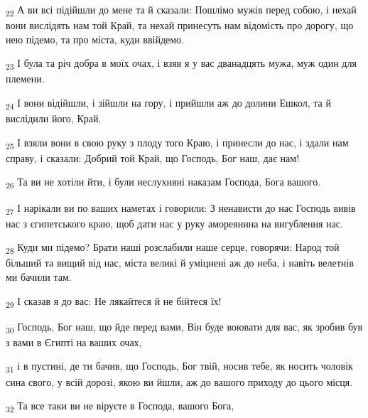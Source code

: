 \begin{tcolorbox}
\textsubscript{22} А ви всі підійшли до мене та й сказали: Пошлімо мужів перед собою, і нехай вони вислідять нам той Край, та нехай принесуть нам відомість про дорогу, що нею підемо, та про міста, куди ввійдемо.
\end{tcolorbox}
\begin{tcolorbox}
\textsubscript{23} І була та річ добра в моїх очах, і взяв я у вас дванадцять мужа, муж один для племени.
\end{tcolorbox}
\begin{tcolorbox}
\textsubscript{24} І вони відійшли, і зійшли на гору, і прийшли аж до долини Ешкол, та й вислідили його, Край.
\end{tcolorbox}
\begin{tcolorbox}
\textsubscript{25} І взяли вони в свою руку з плоду того Краю, і принесли до нас, і здали нам справу, і сказали: Добрий той Край, що Господь, Бог наш, дає нам!
\end{tcolorbox}
\begin{tcolorbox}
\textsubscript{26} Та ви не хотіли йти, і були неслухняні наказам Господа, Бога вашого.
\end{tcolorbox}
\begin{tcolorbox}
\textsubscript{27} І нарікали ви по ваших наметах і говорили: З ненависти до нас Господь вивів нас з єгипетського краю, щоб дати нас у руку амореянина на вигублення нас.
\end{tcolorbox}
\begin{tcolorbox}
\textsubscript{28} Куди ми підемо? Брати наші розслабили наше серце, говорячи: Народ той більший та вищий від нас, міста великі й уміцнені аж до неба, і навіть велетнів ми бачили там.
\end{tcolorbox}
\begin{tcolorbox}
\textsubscript{29} І сказав я до вас: Не лякайтеся й не бійтеся їх!
\end{tcolorbox}
\begin{tcolorbox}
\textsubscript{30} Господь, Бог наш, що йде перед вами, Він буде воювати для вас, як зробив був з вами в Єгипті на ваших очах,
\end{tcolorbox}
\begin{tcolorbox}
\textsubscript{31} і в пустині, де ти бачив, що Господь, Бог твій, носив тебе, як носить чоловік сина свого, у всій дорозі, якою ви йшли, аж до вашого приходу до цього місця.
\end{tcolorbox}
\begin{tcolorbox}
\textsubscript{32} Та все таки ви не віруєте в Господа, вашого Бога,
\end{tcolorbox}
